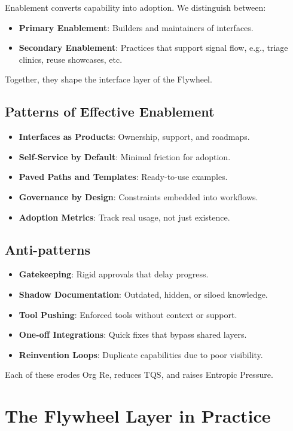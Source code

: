 \documentclass[12pt]{article}
\begin{document}
Enablement converts capability into adoption. We distinguish between:
\begin{itemize}
    \item \textbf{Primary Enablement}: Builders and maintainers of interfaces.
    \item \textbf{Secondary Enablement}: Practices that support signal flow, e.g., triage clinics, reuse showcases, etc.
\end{itemize}

Together, they shape the interface layer of the Flywheel.

\subsection*{Patterns of Effective Enablement}
\begin{itemize}
    \item \textbf{Interfaces as Products}: Ownership, support, and roadmaps.
    \item \textbf{Self-Service by Default}: Minimal friction for adoption.
    \item \textbf{Paved Paths and Templates}: Ready-to-use examples.
    \item \textbf{Governance by Design}: Constraints embedded into workflows.
    \item \textbf{Adoption Metrics}: Track real usage, not just existence.
\end{itemize}

\subsection*{Anti-patterns}
\begin{itemize}
    \item \textbf{Gatekeeping}: Rigid approvals that delay progress.
    \item \textbf{Shadow Documentation}: Outdated, hidden, or siloed knowledge.
    \item \textbf{Tool Pushing}: Enforced tools without context or support.
    \item \textbf{One-off Integrations}: Quick fixes that bypass shared layers.
    \item \textbf{Reinvention Loops}: Duplicate capabilities due to poor visibility.
\end{itemize}

Each of these erodes Org Re, reduces TQS, and raises Entropic Pressure.

\section{The Flywheel Layer in Practice}
\end{document}
